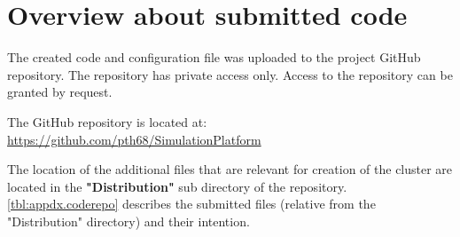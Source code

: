 
\chapter{Overview about submitted code} %

\label{chap:appdx.CodeRepo} %


The created code and configuration file was uploaded to the project GitHub repository. The repository has private access only. Access to the repository can be granted by request.

The GitHub repository is located at: \href{https://github.com/pth68/SimulationPlatform}{https://github.com/pth68/SimulationPlatform}

The location of the additional files that are relevant for creation of the cluster are located in the \mbox{\textbf{"Distribution"}} sub directory of the repository. 
\autoref{tbl:appdx.coderepo} describes the submitted files (relative from the "Distribution" directory) and their intention.

